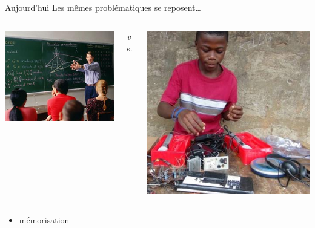 \begin{frame}{Aujourd'hui}
\Large Les mêmes problématiques se reposent\ldots
\vfill
\begin{columns}
	\begin{column}{0.40\linewidth}
		\centering
		\includegraphics[height=0.35\paperheight]{../resources/illustrations/modern_lecture} \\
	\end{column}
	\begin{column}{0.09\linewidth} \centering \huge \emph vs. \end{column}
	\begin{column}{0.40\linewidth}
		\centering
		\includegraphics[height=0.35\paperheight]{../resources/illustrations/Kelvin-Doe} \\
	\end{column}
\end{columns}
\begin{columns}
	\begin{column}{0.49\linewidth}
		\begin{itemize}
			\item mémorisation

\end{itemize}
\end{column}
\end{columns}
\end{frame}
